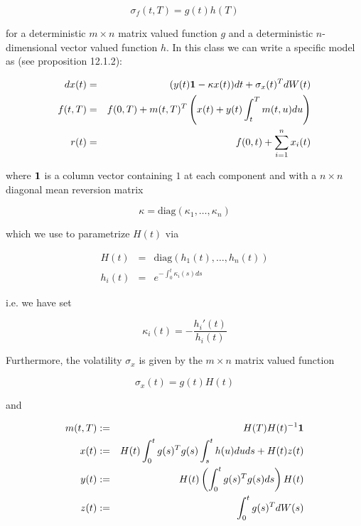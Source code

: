 \documentclass{amsart}
\theoremstyle{plain}
\numberwithin{equation}{section}
\begin{document}
\begin{equation}
\sigma_f(t,T) = g(t)h(T)
\end{equation}

for a deterministic $m \times n$ matrix valued function $g$ and a deterministic $n$-dimensional vector valued function
$h$. In this class we can write a specific model as (see \cite{Andersen_Piterbarg_2010} proposition 12.1.2):

\begin{eqnarray}
  \label{sde_x}
  dx(t) & = & (y(t)  {\bf 1} - \kappa x(t)) dt + \sigma_x(t)^T dW(t) \\
  f(t,T) & = & f(0,T) + m(t,T)^T \left( x(t) + y(t) \int_t^T m(t,u) du \right) \\
  \label{representation_r}
  r(t) & = & f(0,t) + \sum_{i=1}^n x_i(t)
\end{eqnarray}

where ${\bf 1}$ is a column vector containing $1$ at each component and with a $n \times n$ diagonal mean reversion
matrix

\begin{equation}
\kappa = \text{diag}(\kappa_1,\ldots,\kappa_n)
\end{equation}

which we use to parametrize $H(t)$ via

\begin{eqnarray}
  H(t)   &=& \text{diag}(h_1(t), \ldots, h_n(t)) \\
  h_i(t) &=& e^{-\int_0^t \kappa_i(s) ds}
\end{eqnarray}

i.e. we have set

\begin{equation}
  \kappa_i(t) = - \frac{h_i'(t)}{h_i(t)}
\end{equation}

Furthermore, the volatility $\sigma_x$ is given by the $m \times n$ matrix valued function

\begin{equation}\label{sigma_g}
\sigma_x(t) = g(t)H(t)
\end{equation}

and

\begin{eqnarray}
  m(t,T) & := & H(T)H(t)^{-1}{\bf 1} \\
  \label{representation_x}
  x(t) & := & H(t) \int_0^t g(s)^Tg(s) \int_s^t h(u) du ds + H(t) z(t) \\
  \label{representation_y}
  y(t) & := & H(t) \left( \int_0^t g(s)^T g(s) ds \right) H(t) \\
  z(t) & := & \int_0^t g(s)^T dW(s)
\end{eqnarray}
\end{document}

